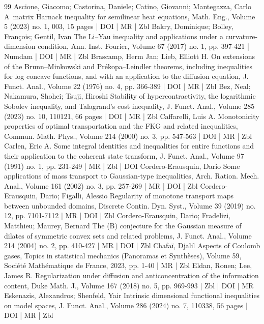 \documentclass[10pt]{amsart}
\theoremstyle{definition}\newtheorem{defi}[theo]{Definition}\newtheorem{rema}[theo]{Remark}\newtheorem{exam}[theo]{Example}\newtheorem{exem}[theo]{Example}\newtheorem{nota}[theo]{Notation}
\begin{document}
\begin{thebibliography}{99}
 Ascione, Giacomo; Castorina, Daniele; Catino, Giovanni; Mantegazza, Carlo A matrix Harnack inequality for semilinear heat equations, Math. Eng., Volume 5 (2023) no. 1, 003, 15 pages | DOI | MR | Zbl
 Bakry, Dominique; Bolley, François; Gentil, Ivan The Li–Yau inequality and applications under a curvature-dimension condition, Ann. Inst. Fourier, Volume 67 (2017) no. 1, pp. 397-421 | Numdam | DOI | MR | Zbl
 Brascamp, Herm Jan; Lieb, Elliott H. On extensions of the Brunn–Minkowski and Prékopa–Leindler theorems, including inequalities for log concave functions, and with an application to the diffusion equation, J. Funct. Anal., Volume 22 (1976) no. 4, pp. 366-389 | DOI | MR | Zbl
 Bez, Neal; Nakamura, Shohei; Tsuji, Hiroshi Stability of hypercontractivity, the logarithmic Sobolev inequality, and Talagrand’s cost inequality, J. Funct. Anal., Volume 285 (2023) no. 10, 110121, 66 pages | DOI | MR | Zbl
 Caffarelli, Luis A. Monotonicity properties of optimal transportation and the FKG and related inequalities, Commun. Math. Phys., Volume 214 (2000) no. 3, pp. 547-563 | DOI | MR | Zbl
 Carlen, Eric A. Some integral identities and inequalities for entire functions and their application to the coherent state transform, J. Funct. Anal., Volume 97 (1991) no. 1, pp. 231-249 | MR | Zbl | DOI
 Cordero-Erausquin, Dario Some applications of mass transport to Gaussian-type inequalities, Arch. Ration. Mech. Anal., Volume 161 (2002) no. 3, pp. 257-269 | MR | DOI | Zbl
 Cordero-Erausquin, Dario; Figalli, Alessio Regularity of monotone transport maps between unbounded domains, Discrete Contin. Dyn. Syst., Volume 39 (2019) no. 12, pp. 7101-7112 | MR | DOI | Zbl
 Cordero-Erausquin, Dario; Fradelizi, Matthieu; Maurey, Bernard The (B) conjecture for the Gaussian measure of dilates of symmetric convex sets and related problems, J. Funct. Anal., Volume 214 (2004) no. 2, pp. 410-427 | MR | DOI | Zbl
 Chafaï, Djalil Aspects of Coulomb gases, Topics in statistical mechanics (Panoramas et Synthèses), Volume 59, Société Mathématique de France, 2023, pp. 1-40 | MR | Zbl
 Eldan, Ronen; Lee, James R. Regularization under diffusion and anticoncentration of the information content, Duke Math. J., Volume 167 (2018) no. 5, pp. 969-993 | Zbl | DOI | MR
 Eskenazis, Alexandros; Shenfeld, Yair Intrinsic dimensional functional inequalities on model spaces, J. Funct. Anal., Volume 286 (2024) no. 7, 110338, 56 pages | DOI | MR | Zbl

\end{thebibliography}
\end{document}
